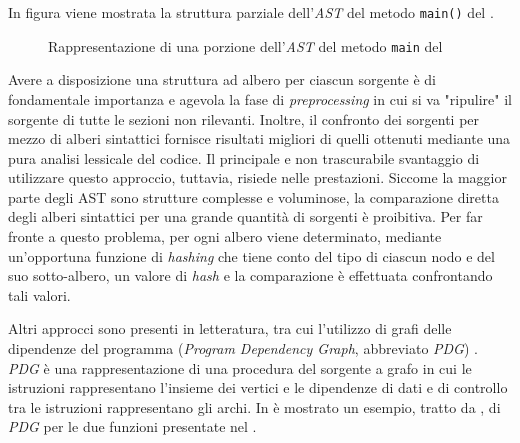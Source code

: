 In figura  viene mostrata la struttura parziale dell'\textit{AST} del metodo \texttt{main()} del .

\begin{figure}
    \caption{Rappresentazione di una porzione dell'\textit{AST} del metodo \texttt{main} del }
    \label{img:01-ast}
\end{figure}

Avere a disposizione una struttura ad albero per ciascun sorgente è di fondamentale importanza e agevola la fase di \textit{preprocessing} in cui si va "ripulire" il sorgente di tutte le sezioni non rilevanti.
%
Inoltre, il confronto dei sorgenti per mezzo di alberi sintattici fornisce risultati migliori di quelli ottenuti mediante una pura analisi lessicale del codice.
%
Il principale e non trascurabile svantaggio di utilizzare questo approccio, tuttavia, risiede nelle prestazioni.
%
Siccome la maggior parte degli AST sono strutture complesse e voluminose, la comparazione diretta degli alberi sintattici per una grande quantità di sorgenti è proibitiva.
%
Per far fronte a questo problema, per ogni albero viene determinato, mediante un'opportuna funzione di \textit{hashing} che tiene conto del tipo di ciascun nodo e del suo sotto-albero, un valore di \textit{hash} e la comparazione è effettuata confrontando tali valori.

Altri approcci sono presenti in letteratura, tra cui l'utilizzo di grafi delle dipendenze del programma (\textit{Program Dependency Graph}, abbreviato \textit{PDG}) \cite{gplag}.
%
\textit{PDG} è una rappresentazione di una procedura del sorgente a grafo in cui le istruzioni rappresentano l'insieme dei vertici e le dipendenze di dati e di controllo tra le istruzioni rappresentano gli archi.
%
In  è mostrato un esempio, tratto da \cite{gplag}, di \textit{PDG} per le due funzioni presentate nel .

